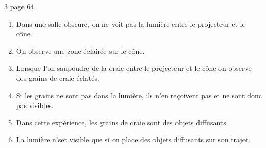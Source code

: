 \begin{myact}{3 page 64}
	\begin{enumerate}
		\item Dans une salle obscure, on ne voit pas la lumière entre le projecteur et le cône.\pause
		\item On observe une zone éclairée sur le cône.\pause
		\item Lorsque l'on saupoudre de la craie entre le projecteur et le cône on observe des grains de craie éclatés.\pause
		\item Si les grains ne sont pas dans la lumière, ils n'en reçoivent pas et ne sont donc pas visibles.\pause
		\item Dans cette expérience, les grains de craie sont des objets diffusants.\pause
		\item La lumière n'set visible que si on place des objets diffusants sur son trajet.
	\end{enumerate}
\end{myact}
